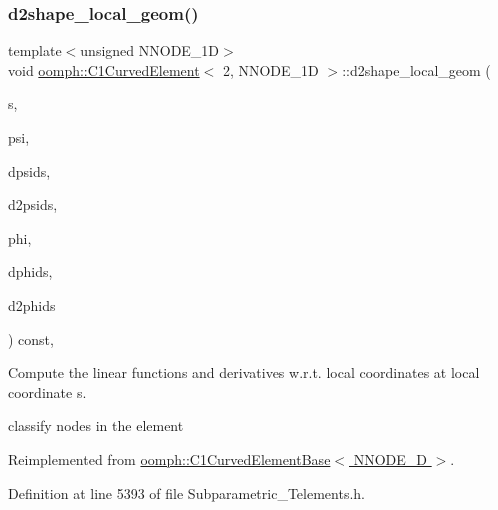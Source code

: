 \subsubsection{\texorpdfstring{d2shape\+\_\+local\+\_\+geom()}{d2shape\_local\_geom()}}
{\footnotesize\ttfamily template$<$unsigned N\+N\+O\+D\+E\+\_\+1D$>$ \\
void \hyperlink{classoomph_1_1C1CurvedElement}{oomph\+::\+C1\+Curved\+Element}$<$ 2, N\+N\+O\+D\+E\+\_\+1D $>$\+::d2shape\+\_\+local\+\_\+geom (\begin{DoxyParamCaption}\item[{const \hyperlink{classoomph_1_1Vector}{Vector}$<$ double $>$ \&}]{s,  }\item[{\hyperlink{classoomph_1_1Shape}{Shape} \&}]{psi,  }\item[{\hyperlink{classoomph_1_1DShape}{D\+Shape} \&}]{dpsids,  }\item[{\hyperlink{classoomph_1_1DShape}{D\+Shape} \&}]{d2psids,  }\item[{\hyperlink{classoomph_1_1Shape}{Shape} \&}]{phi,  }\item[{\hyperlink{classoomph_1_1DShape}{D\+Shape} \&}]{dphids,  }\item[{\hyperlink{classoomph_1_1DShape}{D\+Shape} \&}]{d2phids }\end{DoxyParamCaption}) const\hspace{0.3cm}{\ttfamily [inline]}, {\ttfamily [virtual]}}



Compute the linear functions and derivatives w.\+r.\+t. local coordinates at local coordinate s. 

classify nodes in the element 

Reimplemented from \hyperlink{classoomph_1_1C1CurvedElementBase_abafd0a405e40d018020dbffe49cf7258}{oomph\+::\+C1\+Curved\+Element\+Base$<$ N\+N\+O\+D\+E\+\_\+D $>$}.



Definition at line 5393 of file Subparametric\+\_\+\+Telements.\+h.

\mbox{\label{classoomph_1_1C1CurvedElement_3_012_00_01NNODE__1D_01_4_a17db4cc4715be25a4492c4569d4a8f41}} 
